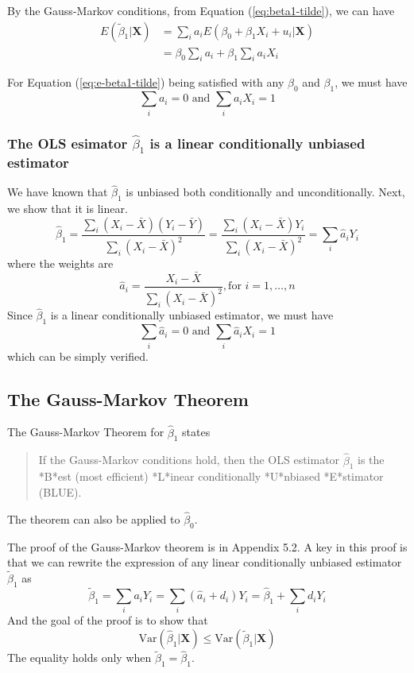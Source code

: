 \documentclass[a4paper,11pt]{article}
\newcommand{\var}{\mathrm{Var}}
\begin{document}
By the Gauss-Markov conditions, from Equation (\ref{eq:beta1-tilde}),  we can have
\begin{equation*}
\begin{split}
E(\tilde{\beta}_1 | \mathbf{X}) &= \sum_i a_i E(\beta_0 + \beta_1 X_i + u_i | \mathbf{X}) \\
&= \beta_0 \sum_i a_i + \beta_1 \sum_i a_i X_i
\end{split}
\end{equation*}

For Equation (\ref{eq:e-beta1-tilde}) being satisfied with any
\(\beta_0\) and \(\beta_1\), we must have
\[ \sum_i a_i = 0 \text{ and } \sum_i a_iX_i = 1 \]

\subsubsection*{The OLS esimator \(\hat{\beta}_1\) is a linear conditionally unbiased estimator}
\label{sec:org30ba6bd}

We have known that \(\hat{\beta}_1\) is unbiased both conditionally and
unconditionally. Next, we show that it is linear. 
\[ \hat{\beta}_1 = \frac{\sum_i (X_i - \bar{X})(Y_i - \bar{Y})}{\sum_i
(X_i - \bar{X})^2} = \frac{\sum_i (X_i - \bar{X})Y_i}{\sum_i
(X_i - \bar{X})^2} = \sum_i \hat{a}_i Y_i \]
where the weights are
\[ \hat{a}_i = \frac{X_i - \bar{X}}{\sum_i (X_i - \bar{X})^2}, \text{
for } i = 1, \ldots, n \] 
Since \(\hat{\beta}_1\) is a linear conditionally unbiased estimator, we
must have
\[ \sum_i \hat{a}_i = 0 \text{ and } \sum_i \hat{a}_i X_i = 1  \]
which can be simply verified.

\subsection{The Gauss-Markov Theorem}
\label{sec:org1778ccf}
The Gauss-Markov Theorem for \(\hat{\beta}_1\) states
\label{org6158aea}
\begin{quote}
If the Gauss-Markov conditions hold, then the OLS estimator
\(\hat{\beta}_1\) is the *B*est (most efficient) *L*inear conditionally
*U*nbiased *E*stimator (BLUE).
\end{quote}

The theorem can also be applied to \(\hat{\beta}_0\).

The proof of the Gauss-Markov theorem is in Appendix 5.2. A key in
this proof is that we can rewrite the expression of any linear
conditionally unbiased estimator \(\tilde{\beta}_1\) as
\[ \tilde{\beta}_1 = \sum_i a_i Y_i = \sum_i (\hat{a}_i + d_i)Y_i =
\hat{\beta}_1 + \sum_i d_i Y_i \]
And the goal of
the proof is to show that
\[ \var(\hat{\beta}_1 | \mathbf{X}) \leq \var(\tilde{\beta}_1 |
\mathbf{X}) \]
The equality holds only when \(\tilde{\beta}_1 = \hat{\beta}_1\). 
\end{document}
